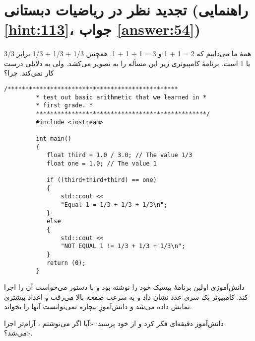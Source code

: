 \section[تجدید نظر در ریاضیات دبستانی]{تجدید نظر در ریاضیات دبستانی \protect{} (راهنمایی \ref{hint:113}، جواب \ref{answer:54})}
\paragraph{}\label{prog:39}
همهٔ ما می‌دانیم که 2 = 1 + 1 و 3 = 1 + 1 + 1. همچنین 1/3 + 1/3 + 1/3 برابر 3/3 یا 1 است. برنامهٔ کامپیوتری زیر این مسأله را به تصویر می‌کشد. ولی به دلایلی درست کار نمی‌کند. چرا؟

\begin{LTR}
    \begin{lstlisting}[style=C++Style]
         /************************************************
         * test out basic arithmetic that we learned in *
         * first grade. *
         ************************************************/
         #include <iostream>

         int main()
         {
         	float third = 1.0 / 3.0; // The value 1/3
         	float one = 1.0; // The value 1

         	if ((third+third+third) == one)
         	{
         		std::cout <<
         		"Equal 1 = 1/3 + 1/3 + 1/3\n";
         	}
         	else
         	{
         		std::cout <<
         		"NOT EQUAL 1 != 1/3 + 1/3 + 1/3\n";
         	}
         	return (0);
         }
    \end{lstlisting}
\end{LTR}

\begin{tcolorbox}
    دانش‌آموزی اولین برنامهٔ بیسیک خود را نوشته بود و با دستور  می‌خواست آن را اجرا کند. کامپیوتر یک سری عدد نشان داد و به سرعت صفحه بالا می‌رفت و اعداد بیشتری نمایش داده می‌شد و دانش‌آموزِ بیچاره نمی‌توانست آنها را بخواند.

    دانش‌آموز دقیقه‌ای فکر کرد و از خود پرسید: «آیا اگر می‌نوشتم ، آرام‌تر اجرا می‌شد؟».
\end{tcolorbox}